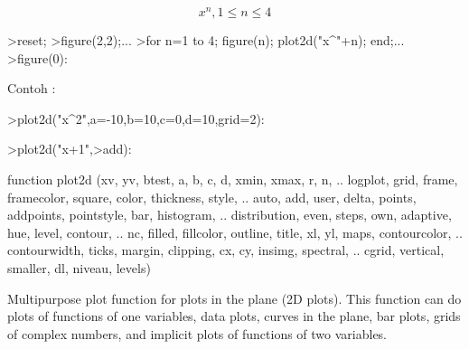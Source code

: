 \documentclass[a4paper,10pt]{article}
\begin{document}
\begin{eulernotebook}
\begin{eulercomment}
\begin{eulercomment}
\begin{eulercomment}
\begin{eulercomment}
\begin{eulercomment}
\end{eulercomment}
\begin{eulerformula}
\[
x^n, 1 \leq n \leq 4
\]
\end{eulerformula}
\begin{eulerprompt}
>reset;
>figure(2,2);...
>for n=1 to 4; figure(n); plot2d("x^"+n); end;...
>figure(0):
\end{eulerprompt}
\begin{eulercomment}
Contoh :
\end{eulercomment}
\begin{eulerprompt}
>plot2d("x^2",a=-10,b=10,c=0,d=10,grid=2):
\end{eulerprompt}
\begin{eulerprompt}
>plot2d("x+1",>add):
\end{eulerprompt}
\begin{eulercomment}
\end{eulercomment}
\begin{eulerttcomment}
  function plot2d (xv, yv, btest, a, b, c, d, xmin, xmax, r, n,  ..
  logplot, grid, frame, framecolor, square, color, thickness, style, ..
  auto, add, user, delta, points, addpoints, pointstyle, bar, histogram,  ..
  distribution, even, steps, own, adaptive, hue, level, contour,  ..
  nc, filled, fillcolor, outline, title, xl, yl, maps, contourcolor, ..
  contourwidth, ticks, margin, clipping, cx, cy, insimg, spectral,  ..
  cgrid, vertical, smaller, dl, niveau, levels)
\end{eulerttcomment}
\begin{eulercomment}
Multipurpose plot function for plots in the plane (2D plots). This function can do
plots of functions of one variables, data plots, curves in the plane, bar plots, grids
of complex numbers, and implicit plots of functions of two variables.


\end{eulercomment}
\end{eulercomment}
\end{eulercomment}
\end{eulercomment}
\end{eulercomment}
\end{eulernotebook}
\end{document}
